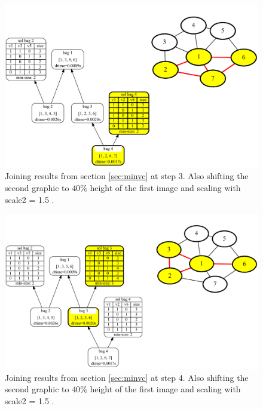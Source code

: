 \documentclass[a4paper, 12pt, bibliography=totoc]{scrartcl}
\begin{document}
\begin{figure}
	\centering
	\includegraphics[width=0.9\linewidth,height=0.9\textheight,keepaspectratio]{images/SVGJOIN/default_06sc153.pdf}
	\caption{Joining results from section \ref{sec:minvc} at step 3. Also shifting the second graphic to $40\%$ height of the first image and scaling with scale2 = 1.5 .}
	\label{fig:joinscaled3}
\end{figure}
\begin{figure}
	\centering
	\includegraphics[width=0.9\linewidth,height=0.9\textheight,keepaspectratio]{images/SVGJOIN/default_06sc154.pdf}
	\caption{Joining results from section \ref{sec:minvc} at step 4. Also shifting the second graphic to $40\%$ height of the first image and scaling with scale2 = 1.5 .}
	\label{fig:joinscaled4}
\end{figure}
\end{document}
